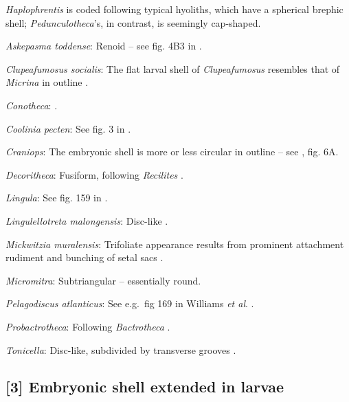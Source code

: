 \documentclass[openany]{book}
\theoremstyle{definition}
\theoremstyle{definition}
\theoremstyle{definition}
\theoremstyle{remark}
\begin{document}
\emph{Haplophrentis} is coded following typical hyoliths, which have a
spherical brephic shell; \emph{Pedunculotheca}'s, in contrast, is
seemingly cap-shaped.

\hypertarget{Askepasma_toddense-coding-2}{}
\emph{Askepasma toddense}: Renoid -- see fig. 4B3 in
\citet{Topper2013Theoldest}.

\hypertarget{Clupeafumosus_socialis-coding-2}{}
\emph{Clupeafumosus socialis}: The flat larval shell of
\emph{Clupeafumosus} resembles that of \emph{Micrina} in outline
\citetext{\citealp{Topper2013Reappraisalof}; \citealp[cf.][]{Holmer2011Firstrecord}}.

\hypertarget{Conotheca-coding-2}{}
\emph{Conotheca}: \citep{Wrona2003}.

\hypertarget{Coolinia_pecten-coding-2}{}
\emph{Coolinia pecten}: See fig. 3 in
\citet{Bassett2017Earliestontogeny}.

\hypertarget{Craniops-coding-2}{}
\emph{Craniops}: The embryonic shell is more or less circular in outline
-- see \citet{Freeman1999Changesin}, fig. 6A.

\hypertarget{Decoritheca-coding-2}{}
\emph{Decoritheca}: Fusiform, following \emph{Recilites}
\citep{Dzik1978}.

\hypertarget{Lingula-coding-2}{}
\emph{Lingula}: See fig. 159 in \citet{Williams1997Introduction}.

\hypertarget{Lingulellotreta_malongensis-coding-2}{}
\emph{Lingulellotreta malongensis}: Disc-like \citep{Li2004}.

\hypertarget{Mickwitzia_muralensis-coding-2}{}
\emph{Mickwitzia muralensis}: Trifoliate appearance results from
prominent attachment rudiment and bunching of setal sacs
\citep{Balthasar2009Thebrachiopod}.

\hypertarget{Micromitra-coding-2}{}
\emph{Micromitra}: Subtriangular -- essentially round.

\hypertarget{Pelagodiscus_atlanticus-coding-2}{}
\emph{Pelagodiscus atlanticus}: See e.g.~fig 169 in Williams \emph{et
al}. \citeyearpar{Williams1997Introduction}.

\hypertarget{Probactrotheca-coding-2}{}
\emph{Probactrotheca}: Following \emph{Bactrotheca}
\citep{Dzik1980Ontogenyof}.

\hypertarget{Tonicella-coding-2}{}
\emph{Tonicella}: Disc-like, subdivided by transverse grooves
\citep{Wanninger2002C}.

\subsection*{{[}3{]} Embryonic shell extended in
larvae}\label{embryonic-shell-extended-in-larvae}
\end{document}
